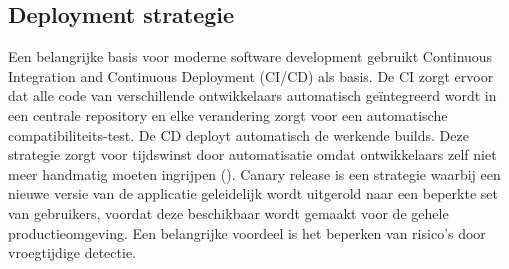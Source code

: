 \subsection{Deployment strategie}
Een belangrijke basis voor moderne software development gebruikt Continuous Integration and Continuous Deployment (CI/CD) als basis. De CI zorgt ervoor dat alle code van verschillende ontwikkelaars automatisch geïntegreerd wordt in een centrale repository en elke verandering zorgt voor een automatische compatibiliteits-test. De CD deployt automatisch de werkende builds. Deze strategie zorgt voor tijdswinst door automatisatie omdat ontwikkelaars zelf niet meer handmatig moeten ingrijpen (\cite{Gowda2022}). 
Canary release is een strategie waarbij een nieuwe versie van de applicatie geleidelijk wordt uitgerold naar een beperkte set van gebruikers, voordat deze beschikbaar wordt gemaakt voor de gehele productieomgeving. Een belangrijke voordeel is het beperken van risico's door vroegtijdige detectie.







